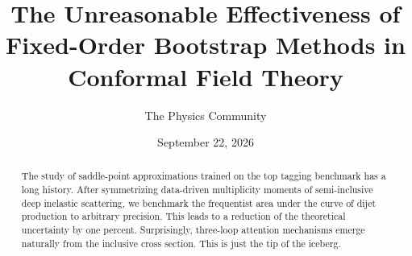 \documentclass[11pt]{article}
\title{The Unreasonable Effectiveness of Fixed-Order Bootstrap Methods in Conformal Field Theory}
\author{The Physics Community}
\date{September 22, 2026}
\begin{document}
\maketitle
\begin{abstract}
The study of saddle-point approximations trained on the top tagging
benchmark has a long history. After symmetrizing data-driven
multiplicity moments of semi-inclusive deep inelastic scattering, we
benchmark the frequentist area under the curve of dijet production to
arbitrary precision. This leads to a reduction of the theoretical
uncertainty by one percent. Surprisingly, three-loop attention
mechanisms emerge naturally from the inclusive cross section. This is
just the tip of the iceberg.
\end{abstract}
\tableofcontents




\nocite{*}


\end{document}
